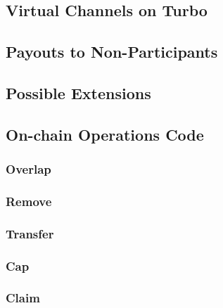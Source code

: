 \documentclass{article}
\theoremstyle{definition}
\begin{document}
\subsection{Virtual Channels on Turbo}
\subsection{Payouts to Non-Participants}
\subsection{Possible Extensions}

\subsection{On-chain Operations Code}
\subsubsection{Overlap}
\begin{minipage}{\linewidth} %
  
\end{minipage}

\subsubsection{Remove}
\begin{minipage}{\linewidth} %
  
\end{minipage}

\subsubsection{Transfer}
\begin{minipage}{\linewidth} %
  
\end{minipage}

\subsubsection{Cap}\label{appendix:cap}
\begin{minipage}{\linewidth} %
  
\end{minipage}

\subsubsection{Claim}\label{appendix:claim}
\begin{minipage}{\linewidth} %
  
\end{minipage}
\end{document}
